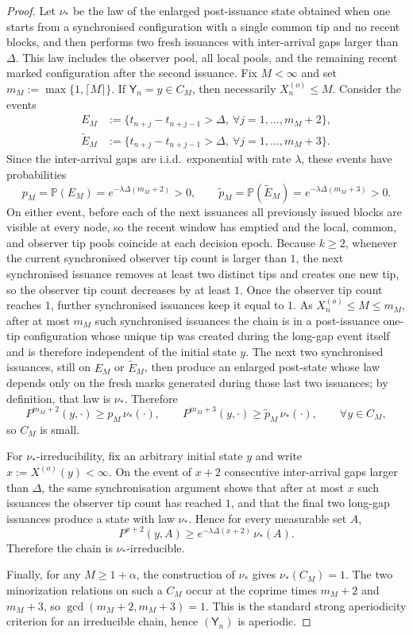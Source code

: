 \documentclass[a4paper,12pt,oneside,reqno]{amsart}
\renewcommand{\P}{{\mathbb P}}
\newcommand{\1}{{\mathbf 1}}
\begin{document}
\begin{proof}
Let $\nu_\ast$ be the law of the enlarged post-issuance state obtained when one starts from a synchronised configuration with a single common tip and no recent blocks, and then performs two fresh issuances with inter-arrival gaps larger than $\Delta$. This law includes the observer pool, all local pools, and the remaining recent marked configuration after the second issuance. Fix $M<\infty$ and set $m_M:=\max\{1,\lceil M\rceil\}$. If $\mathsf{Y}_n=y\in C_M$, then necessarily $X_n^{(o)}\le M$. Consider the events
\begin{align*}
   E_M&:=\{t_{n+j}-t_{n+j-1}>\Delta,\ \forall j=1,\dots,m_M+2\},\\
   \widetilde E_M&:=\{t_{n+j}-t_{n+j-1}>\Delta,\ \forall j=1,\dots,m_M+3\}.
\end{align*}
Since the inter-arrival gaps are i.i.d.\ exponential with rate $\lambda$, these events have probabilities
\[
   p_M = \P(E_M)=e^{-\lambda\Delta (m_M+2)}>0,
   \qquad
   \widetilde p_M = \P(\widetilde E_M)=e^{-\lambda\Delta (m_M+3)}>0.
\]
On either event, before each of the next issuances all previously issued blocks are visible at every node, so the recent window has emptied and the local, common, and observer tip pools coincide at each decision epoch. Because $k\ge 2$, whenever the current synchronised observer tip count is larger than $1$, the next synchronised issuance removes at least two distinct tips and creates one new tip, so the observer tip count decreases by at least $1$. Once the observer tip count reaches $1$, further synchronised issuances keep it equal to $1$. As $X_n^{(o)}\le M\le m_M$, after at most $m_M$ such synchronised issuances the chain is in a post-issuance one-tip configuration whose unique tip was created during the long-gap event itself and is therefore independent of the initial state $y$. The next two synchronised issuances, still on $E_M$ or $\widetilde E_M$, then produce an enlarged post-state whose law depends only on the fresh marks generated during those last two issuances; by definition, that law is $\nu_\ast$. Therefore
\[
   P^{m_M+2}(y,\cdot)\ge p_M\,\nu_\ast(\cdot),
   \qquad
   P^{m_M+3}(y,\cdot)\ge \widetilde p_M\,\nu_\ast(\cdot),
   \qquad \forall y\in C_M,
\]
so $C_M$ is small.

For $\nu_\ast$-irreducibility, fix an arbitrary initial state $y$ and write $x:=X^{(o)}(y)<\infty$. On the event of $x+2$ consecutive inter-arrival gaps larger than $\Delta$, the same synchronisation argument shows that after at most $x$ such issuances the observer tip count has reached $1$, and that the final two long-gap issuances produce a state with law $\nu_\ast$. Hence for every measurable set $A$,
\[
   P^{x+2}(y,A)\ge e^{-\lambda\Delta(x+2)}\,\nu_\ast(A).
\]
Therefore the chain is $\nu_\ast$-irreducible.

Finally, for any $M\ge 1+\alpha$, the construction of $\nu_\ast$ gives $\nu_\ast(C_M)=1$. The two minorization relations on such a $C_M$ occur at the coprime times $m_M+2$ and $m_M+3$, so $\gcd(m_M+2,m_M+3)=1$. This is the standard strong aperiodicity criterion for an irreducible chain, hence $(\mathsf{Y}_n)$ is aperiodic.
\end{proof}
\end{document}
